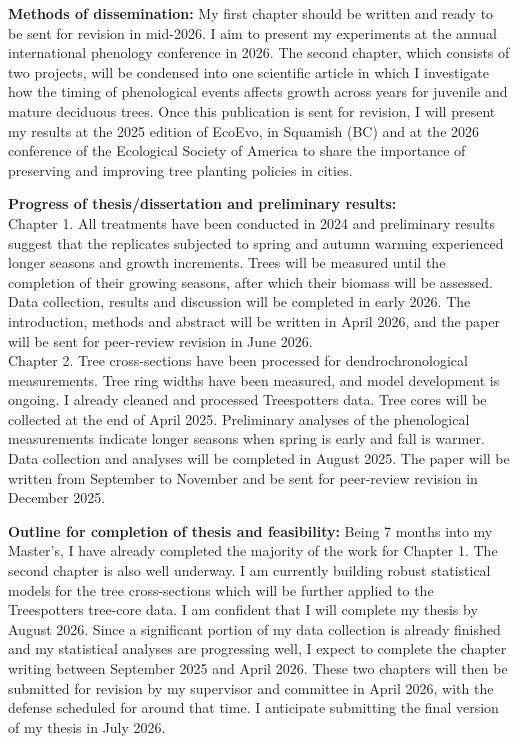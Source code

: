 \documentclass[11pt,letter]{article}
\begin{document}
\textbf{Methods of dissemination:} My first chapter should be written and ready to be sent for revision in mid-2026. I aim to present my experiments at the annual international phenology conference in 2026. The second chapter, which consists of two projects, will be condensed into one scientific article in which I investigate how the timing of phenological events affects growth across years for juvenile and mature deciduous trees. Once this publication is sent for revision, I will present my results at the 2025 edition of EcoEvo, in Squamish (BC) and at the 2026 conference of the Ecological Society of America to share the importance of preserving and improving tree planting policies in cities.
\par
\textbf{Progress of thesis/dissertation and preliminary results:}\\ 
Chapter 1. All treatments have been conducted in 2024 and preliminary results suggest that the replicates subjected to spring and autumn warming experienced longer seasons and growth increments. Trees will be measured until the completion of their growing seasons, after which their biomass will be assessed. Data collection, results and discussion will be completed in early 2026. The introduction, methods and abstract will be written in April 2026, and the paper will be sent for peer-review revision in June 2026.
\\
Chapter 2. Tree cross-sections have been processed for dendrochronological measurements. Tree ring widths have been measured, and model development is ongoing. I already cleaned and processed Treespotters data. Tree cores will be collected at the end of April  2025. Preliminary analyses of the phenological measurements indicate longer seasons when spring is early and fall is warmer. Data collection and analyses will be completed in August 2025. The paper will be written from September to November and be sent for peer-review revision in December 2025.

\textbf{Outline for completion of thesis and feasibility:} Being 7 months into my Master’s, I have already completed the majority of the work for Chapter 1. The second chapter is also well underway. I am currently building robust statistical models for the tree cross-sections which will be further applied to the Treespotters tree-core data. 
I am confident that I will complete my thesis by August 2026. Since a significant portion of my data collection is already finished and my statistical analyses are progressing well, I expect to complete the chapter writing between September 2025 and April 2026. These two chapters will then be submitted for revision by my supervisor and committee in April 2026, with the defense scheduled for around that time. I anticipate submitting the final version of my thesis in July 2026.
\end{document}
